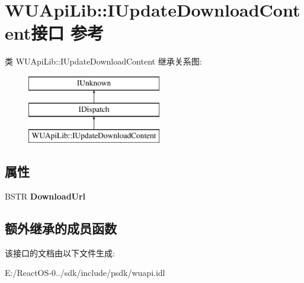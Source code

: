 \hypertarget{interface_w_u_api_lib_1_1_i_update_download_content}{}\section{W\+U\+Api\+Lib\+:\+:I\+Update\+Download\+Content接口 参考}
\label{interface_w_u_api_lib_1_1_i_update_download_content}
类 W\+U\+Api\+Lib\+:\+:I\+Update\+Download\+Content 继承关系图\+:\begin{figure}[H]
\begin{center}
\leavevmode
\includegraphics[height=3.000000cm]{interface_w_u_api_lib_1_1_i_update_download_content}
\end{center}
\end{figure}
\subsection*{属性}
\begin{DoxyCompactItemize}
\item 
\mbox{\label{interface_w_u_api_lib_1_1_i_update_download_content_a9e4740a27ebca59d7595da3b426f314e}} 
B\+S\+TR {\bfseries Download\+Url}
\end{DoxyCompactItemize}
\subsection*{额外继承的成员函数}


该接口的文档由以下文件生成\+:\begin{DoxyCompactItemize}
\item 
E\+:/\+React\+O\+S-\/0../sdk/include/psdk/wuapi.\+idl\end{DoxyCompactItemize}

